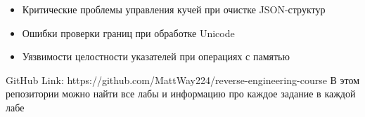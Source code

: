 \begin{itemize}
    \item Критические проблемы управления кучей при очистке JSON-структур
    \item Ошибки проверки границ при обработке Unicode
    \item Уязвимости целостности указателей при операциях с памятью
\end{itemize}

    \begin{thebibliography}{1}
        GitHub Link: https://github.com/MattWay224/reverse-engineering-course
        В этом репозитории можно найти все лабы и информацию про каждое задание в каждой лабе
    \end{thebibliography}

